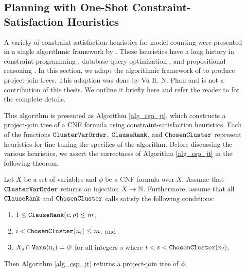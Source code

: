 \subsection{Planning with One-Shot Constraint-Satisfaction Heuristics}
\label{sec_csp}

A variety of constraint-satisfaction heuristics for model counting were presented in a single algorithmic framework by \cite{DPV20}.
These heuristics have a long history in constraint programming \cite{dechter03}, database-query optimization \cite{MPPV04}, and propositional reasoning \cite{pan2005symbolic}.
In this section, we adapt the algorithmic framework of \cite{DPV20} to produce project-join trees.
This adaption was done by Vu H. N. Phan and is not a contribution of this thesis. We outline it briefly here and refer the reader to \cite{dudek2020dpmc} for the complete details.

This algorithm is presented as Algorithm \ref{alg_csp_jt}, which constructs a project-join tree of a CNF formula using constraint-satisfaction heuristics.
Each of the functions $\texttt{\upshape ClusterVarOrder}$, $\texttt{\upshape ClauseRank}$, and $\texttt{\upshape ChosenCluster}$ represent heuristics for fine-tuning the specifics of the algorithm.
Before discussing the various heuristics, we assert the correctness of Algorithm \ref{alg_csp_jt} in the following theorem.
\begin{theorem}
\label{thm_csp_jt}
    Let $X$ be a set of variables and $\phi$ be a CNF formula over $X$.
    Assume that $\texttt{\upshape ClusterVarOrder}$ returns an injection $X \to \mathbb{N}$.
    Furthermore, assume that all $\texttt{\upshape ClauseRank}$ and $\texttt{\upshape ChosenCluster}$ calls satisfy the following conditions:
    \begin{enumerate}[ref=\arabic*]
        \item $1 \le \texttt{\upshape ClauseRank}(c, \rho) \le m$, \label{cond1}
        \item $i < \texttt{\upshape ChosenCluster}(n_i) \le m$, and \label{cond2}
        \item $X_s \cap \texttt{\upshape Vars}(n_i) = \varnothing$ for all integers $s$ where $i < s < \texttt{\upshape ChosenCluster}(n_i)$. \label{cond3}
    \end{enumerate}
    Then Algorithm \ref{alg_csp_jt} returns a project-join tree of $\phi$.
\end{theorem}

